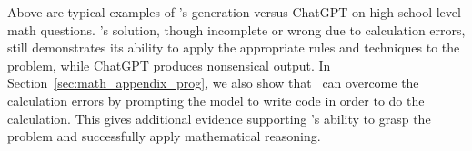 Above are typical examples of {\DV}'s generation versus ChatGPT on high school-level math questions. {\DV}'s solution, though incomplete or wrong due to calculation errors, still demonstrates its ability to apply the appropriate rules and techniques to the problem, while ChatGPT produces nonsensical output. In Section~\ref{sec:math_appendix_prog}, we also show that \DV\ can overcome the calculation errors by prompting the model to write code in order to do the calculation. This gives additional evidence supporting \DV's ability to grasp the problem and successfully apply mathematical reasoning. 



